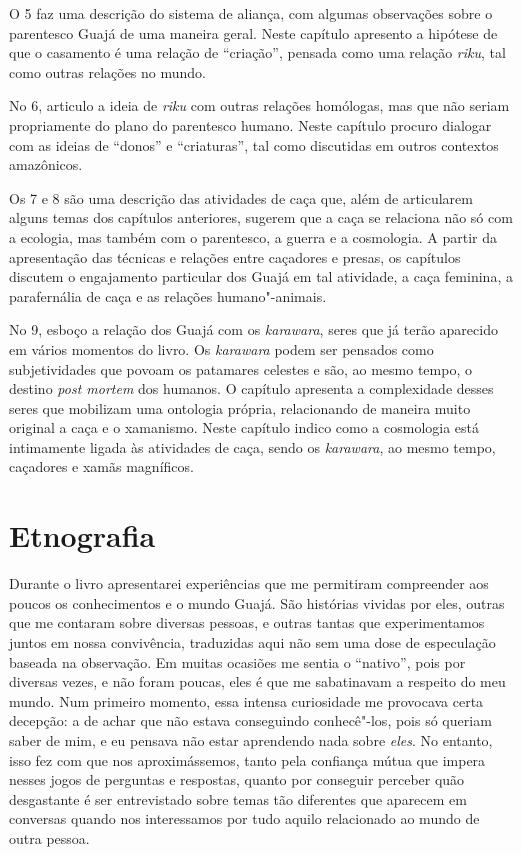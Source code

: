 O  5 faz uma descrição do sistema de aliança, com
algumas observações sobre o parentesco Guajá de uma maneira geral. Neste
capítulo apresento a hipótese de que o casamento é uma relação de
``criação'', pensada como uma relação \emph{riku}, tal como outras
relações no mundo.

No  6, articulo a ideia de \emph{riku} com outras relações homólogas, mas que não seriam
propriamente do plano do parentesco humano. Neste capítulo procuro
dialogar com as ideias de ``donos'' e ``criaturas'', tal como discutidas em
outros contextos amazônicos.

Os  7 e 8 são uma descrição das atividades de caça
que, além de articularem alguns temas dos capítulos anteriores, sugerem
que a caça se relaciona não só com a ecologia, mas também com o
parentesco, a guerra e a cosmologia. A partir da apresentação das
técnicas e relações entre caçadores e presas, os capítulos discutem o
engajamento particular dos Guajá em tal atividade, a caça feminina, a
parafernália de caça e as relações humano"-animais.

No  9, esboço a relação dos Guajá com os
\emph{karawara}, seres que já terão aparecido em vários momentos do
livro. Os \emph{karawara} podem ser pensados como subjetividades que
povoam os patamares celestes e são, ao mesmo tempo, o destino \emph{post
mortem} dos humanos. O capítulo apresenta a complexidade desses seres
que mobilizam uma ontologia própria, relacionando de maneira muito
original a caça e o xamanismo. Neste capítulo indico como a
cosmologia está intimamente ligada às atividades de caça, sendo os
\emph{karawara}, ao mesmo tempo, caçadores e xamãs magníficos.

\section{Etnografia}\label{etnografia}

Durante o livro apresentarei experiências que me permitiram compreender
aos poucos os conhecimentos e o mundo Guajá. São histórias vividas por
eles, outras que me contaram sobre diversas pessoas, e outras tantas que
experimentamos juntos em nossa convivência, traduzidas aqui não sem uma
dose de especulação baseada na observação. Em muitas ocasiões me sentia
o ``nativo'', pois por diversas vezes, e não foram poucas, eles é que me
sabatinavam a respeito do meu mundo. Num primeiro momento, essa intensa
curiosidade me provocava certa decepção: a de achar que não estava
conseguindo conhecê"-los, pois só queriam saber de mim, e eu pensava não
estar aprendendo nada sobre \emph{eles}. No entanto, isso fez com que
nos aproximássemos, tanto pela confiança mútua que impera nesses jogos
de perguntas e respostas, quanto por conseguir perceber quão desgastante
é ser entrevistado sobre temas tão diferentes que aparecem em conversas
quando nos interessamos por tudo aquilo relacionado ao mundo de outra
pessoa.

